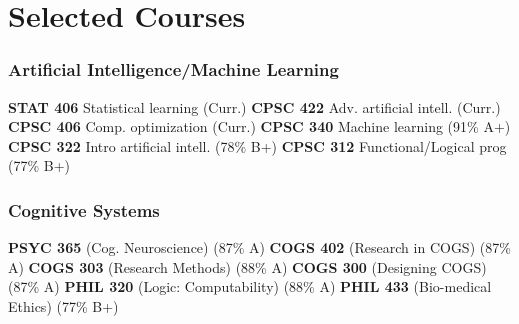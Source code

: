 \documentclass{tccv}
\begin{document}
    \section{Selected Courses}
    
    \subsubsection{Artificial Intelligence/Machine Learning}
    \begin{factlist}
    \item{}
         {  \textbf{STAT 406} Statistical learning (Curr.)
         \qquad
            \textbf{CPSC 422} Adv. artificial intell. (Curr.)
        \qquad
            \textbf{CPSC 406} Comp. optimization (Curr.)
        \qquad
            \textbf{CPSC 340} Machine learning (91\% A+) 
        \qquad
            \textbf{CPSC 322} Intro artificial intell. (78\% B+)
        \qquad
            \textbf{CPSC 312} Functional/Logical prog (77\% B+)}
    \end{factlist}
    \subsubsection{Cognitive Systems}
    \begin{factlist}
    \item{}
         {  \textbf{PSYC 365} (Cog. Neuroscience) (87\% A)
         \qquad \qquad \qquad
            \textbf{COGS 402} (Research in COGS) (87\% A)
        \qquad \qquad \qquad
            \textbf{COGS 303} (Research Methods) (88\% A)
        \qquad \qquad \qquad
            \textbf{COGS 300} (Designing COGS) (87\% A)
        \qquad \qquad \qquad
            \textbf{PHIL 320} (Logic: Computability) (88\% A)
        \qquad \qquad \qquad
            \textbf{PHIL 433} (Bio-medical Ethics) (77\% B+)}
    \end{factlist}
    
    \iffalse
    \subsubsection{Qualitative Courses}
    \begin{factlist}
    \item{}
         {  \textbf{PHIL 451} (Phil. of the mind) 
            \textbf{PHIL 441} (Phil. of perception)
            \textbf{PHIL 433} (Bio/med ethics)}
         
    \end{factlist}
    \fi
    
\end{document}

